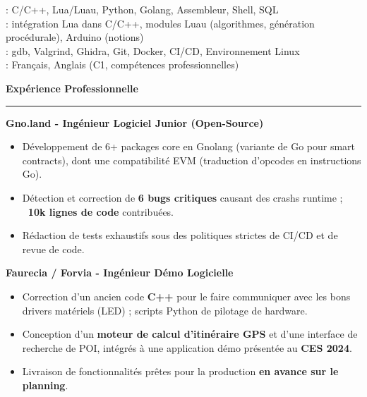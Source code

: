 \documentclass[9pt]{extarticle}
\begin{document}
\hspace*{5pt}{\bfseries Maîtrise}: C/C++, Lua/Luau, Python, Golang, Assembleur, Shell, SQL
\\
\hspace*{5pt}{\bfseries Scripting \& Embarqué}: intégration Lua dans C/C++, modules Luau (algorithmes, génération procédurale), Arduino (notions)
\\
\hspace*{5pt}{\bfseries Outils}: gdb, Valgrind, Ghidra, Git, Docker, CI/CD, Environnement Linux
\\
\hspace*{5pt}{\bfseries Langues}: Français, Anglais (C1, compétences professionnelles)

\par\vspace{5pt}

{\large\bfseries Expérience Professionnelle}
\par\vspace{-8pt}
\rule{\linewidth}{0.4pt}
\par\vspace{5pt}

{\bfseries Gno.land - Ingénieur Logiciel Junior (Open-Source)}
\begin{itemize}[noitemsep, topsep=0pt]
	\item Développement de 6+ packages core en Gnolang (variante de Go pour smart contracts), dont une compatibilité EVM (traduction d'opcodes en instructions Go).
	\item Détection et correction de {\bfseries 6 bugs critiques} causant des crashs runtime ; {\bfseries ~10k lignes de code} contribuées.
	\item Rédaction de tests exhaustifs sous des politiques strictes de CI/CD et de revue de code.
\end{itemize}

\par\vspace{5pt}

{\bfseries Faurecia / Forvia - Ingénieur Démo Logicielle}
\begin{itemize}[noitemsep, topsep=0pt]
	\item Correction d'un ancien code {\bfseries C++} pour le faire communiquer avec les bons drivers matériels (LED) ; scripts Python de pilotage de hardware.
	\item Conception d'un {\bfseries moteur de calcul d'itinéraire GPS} et d'une interface de recherche de POI, intégrés à une application démo présentée au {\bfseries CES 2024}.
	\item Livraison de fonctionnalités prêtes pour la production {\bfseries en avance sur le planning}.
\end{itemize}
\end{document}
